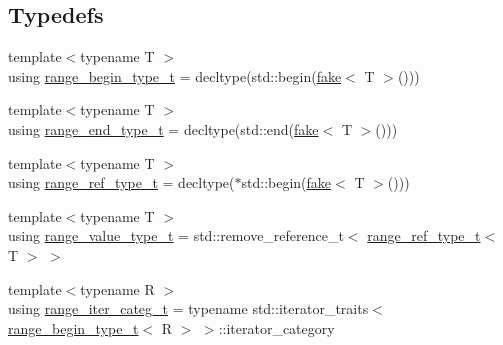 \subsection*{Typedefs}
\begin{DoxyCompactItemize}
\item 
{\footnotesize template$<$typename T $>$ }\\using \mbox{\hyperlink{namespace_r_a_h___n_a_m_e_s_p_a_c_e_a46705781d6869d5151141f871ced1e9c}{range\+\_\+begin\+\_\+type\+\_\+t}} = decltype(std\+::begin(\mbox{\hyperlink{namespace_r_a_h___n_a_m_e_s_p_a_c_e_a23011f56a88d50b186adcd2ba96daecd}{fake}}$<$ T $>$()))
\item 
{\footnotesize template$<$typename T $>$ }\\using \mbox{\hyperlink{namespace_r_a_h___n_a_m_e_s_p_a_c_e_aadeb8c12d454f4cc70bf80766871d3b2}{range\+\_\+end\+\_\+type\+\_\+t}} = decltype(std\+::end(\mbox{\hyperlink{namespace_r_a_h___n_a_m_e_s_p_a_c_e_a23011f56a88d50b186adcd2ba96daecd}{fake}}$<$ T $>$()))
\item 
{\footnotesize template$<$typename T $>$ }\\using \mbox{\hyperlink{namespace_r_a_h___n_a_m_e_s_p_a_c_e_acbe6e664ee98ab43f993f56d9b9ff78c}{range\+\_\+ref\+\_\+type\+\_\+t}} = decltype($\ast$std\+::begin(\mbox{\hyperlink{namespace_r_a_h___n_a_m_e_s_p_a_c_e_a23011f56a88d50b186adcd2ba96daecd}{fake}}$<$ T $>$()))
\item 
{\footnotesize template$<$typename T $>$ }\\using \mbox{\hyperlink{namespace_r_a_h___n_a_m_e_s_p_a_c_e_a18265be3353813dd9328818516e0db60}{range\+\_\+value\+\_\+type\+\_\+t}} = std\+::remove\+\_\+reference\+\_\+t$<$ \mbox{\hyperlink{namespace_r_a_h___n_a_m_e_s_p_a_c_e_acbe6e664ee98ab43f993f56d9b9ff78c}{range\+\_\+ref\+\_\+type\+\_\+t}}$<$ T $>$ $>$
\item 
{\footnotesize template$<$typename R $>$ }\\using \mbox{\hyperlink{namespace_r_a_h___n_a_m_e_s_p_a_c_e_ad5ebb55d3cc13168a7da1ccdf509dc6e}{range\+\_\+iter\+\_\+categ\+\_\+t}} = typename std\+::iterator\+\_\+traits$<$ \mbox{\hyperlink{namespace_r_a_h___n_a_m_e_s_p_a_c_e_a46705781d6869d5151141f871ced1e9c}{range\+\_\+begin\+\_\+type\+\_\+t}}$<$ R $>$ $>$\+::iterator\+\_\+category
\end{DoxyCompactItemize}

